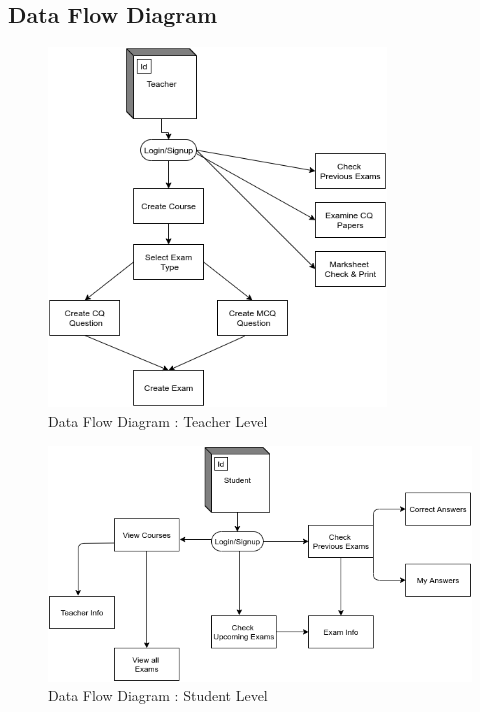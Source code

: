 \documentclass[10pt]{article}
\begin{document}
\subsection{Data Flow Diagram}

\begin{figure}[H]
  \centering
  \centerline{\includegraphics[width=0.8\textwidth,height=0.5\textheight]{diagram/dataflow-teacher.png}}
  \caption{Data Flow Diagram : Teacher Level}
  \label{fig}
\end{figure}

\begin{figure}[H]
  \centering
  \centerline{\includegraphics[width=\textwidth]{diagram/dataflow-student.png}}
  \caption{Data Flow Diagram : Student Level}
  \label{fig}
\end{figure}
\end{document}
